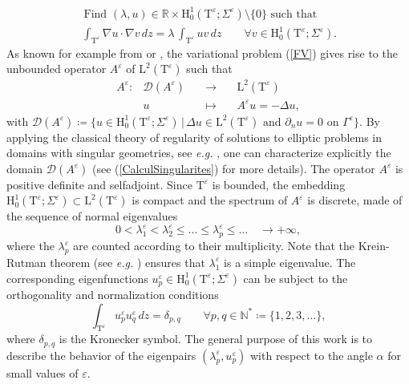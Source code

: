 \documentclass[11pt,a4paper]{article}
\newcommand{\dsp}{\displaystyle}
\newcommand{\eps}{\varepsilon}
\newcommand{\mrm}[1]{\mathrm{#1}}
\newcommand{\N}{\mathbb{N}}
\newcommand{\R}{\mathbb{R}}
\newcommand{\mL}{\mrm{L}}
\newcommand{\mH}{\mrm{H}}
\begin{document}
\begin{equation} \label{FV}
\begin{array}{|l}
\mbox{ Find }(\lambda,u)\in\R\times \mH_0^1(\mathrm{T}^\eps ; \Sigma^\eps)\setminus\{0\}\mbox{ such that}\\[5pt]
\,\dsp\int_{\mathrm{T}^\eps} \nabla u\cdot\nabla v\,dz = \lambda\,\int_{\mathrm{T}^\eps} u   v\,dz
\qquad\forall v \in \mH_0^1(\mathrm{T}^\eps ; \Sigma^\eps).
\end{array}
\end{equation}
As known for example from \cite[\S10.1]{BiSo87} or \cite[Chap.\,VIII.6]{RS78}, the variational problem (\ref{FV}) gives rise to the unbounded operator $A^\eps$ of $\mL^2(\mathrm{T}^\eps)$ such that
\begin{equation}\label{DefAeps}
\begin{array}{rccl}
A^\eps:&\mathcal{D}(A^\eps)&\quad\to&\quad\mL^2(\mathrm{T}^\eps)\\[6pt]
 & u & \quad\mapsto&\quad A^\eps u=-\Delta u,
\end{array}
\end{equation}
with $\mathcal{D}(A^\eps)\coloneqq\{u\in\mH_0^1(\mathrm{T}^\eps ; \Sigma^\eps)\,|\,\Delta u\in\mL^2(\mathrm{T}^\eps)\mbox{ and }\partial_n u=0\mbox{ on }\Gamma^\eps\}$. By applying the classical theory of regularity of solutions to elliptic problems in domains with singular geometries, see \textit{e.g.} \cite{Kond67,KoMR97}, one can characterize explicitly the domain $\mathcal{D}(A^\eps)$ (see (\ref{CalculSingularites}) for more details). The operator $A^\eps$ is positive definite and selfadjoint. Since $\mathrm{T}^\eps$ is bounded, the embedding $\mH_0^1(\mathrm{T}^\eps ; \Sigma^\eps)\subset \mL^2(\mathrm{T}^\eps)$ is compact and the spectrum of $A^\eps$ is discrete, made of the sequence of normal eigenvalues
\begin{equation}\label{DefEigenfunctions}
0<\lambda^\eps_1 < \lambda^\eps_{2} \le \dots \le \lambda^\eps_p \le \dots \quad\to +\infty,
\end{equation}
where the $\lambda^\eps_p$ are counted according to their multiplicity. Note that the Krein-Rutman theorem (see \textit{e.g.} \cite[Thm.\,1.2.5]{Henr06}) ensures that $\lambda^\eps_1$ is a simple eigenvalue. The corresponding eigenfunctions $u^\eps_p\in
\mH_0^1(\mathrm{T}^\eps ; \Sigma^\eps)$ can be subject to the orthogonality and normalization conditions 
\[
\int_{\mathrm{T}^\eps} u^\eps_p u^\eps_q\,dz =\delta_{p,q}\qquad\forall p,q\in\N^\ast\coloneqq\{1,2,3,\dots\},
\]
where $\delta_{p,q}$ is the Kronecker symbol. The general purpose of this work is to describe the behavior of the eigenpairs $(\lambda^\eps_p,u^\eps_p)$ with respect to the angle $\alpha$ for small values of $\eps$. 
\end{document}
